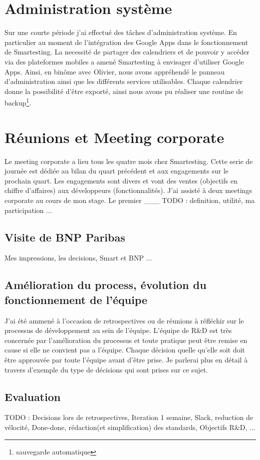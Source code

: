 \section{Administration système}
Sur une courte période j'ai effectué des t\^aches d'administration système. En particulier au moment de l'intégration des Google Apps dans le fonctionnement de Smartesting. La necessité de partager des calendriers et de pouvoir y accéder via des plateformes mobiles a amené Smartesting à envisager d'utiliser Google Apps. Ainsi, en binôme avec Olivier, nous avons appréhendé le panneau d'administration ainsi que les différents services utilisables. Chaque calendrier donne la possibilité d'être exporté, ainsi nous avons pu réaliser une routine de backup\footnote{sauvegarde automatique}.

\section{Réunions et Meeting corporate}
Le meeting corporate a lieu tous les quatre mois chez Smartesting. Cette serie de journée est dédiée au bilan du quart précédent et aux engagements sur le prochain quart. Les engagements sont divers et vont des ventes (objectifs en chiffre d'affaires) aux développeurs (fonctionnalités). J'ai assisté à deux meetings corporate au cours de mon stage. Le premier ___
TODO : definition, utilité, ma participation ...

\subsection{Visite de BNP Paribas}
Mes impressions, les decisions, Smart et BNP ...

\subsection{Amélioration du process, évolution du fonctionnement de l'équipe}
J'ai été ammené à l'occasion de retrospectives ou de réunions à réfléchir sur le processus de développement au sein de l'équipe. L'équipe de R\&D est très concernée par l'amélioration du processus et toute pratique peut être remise en cause si elle ne convient pas a l'équipe. Chaque décision quelle qu'elle soit doit être approuvée par toute l'équipe avant d'être prise. Je parlerai plus en détail à travers d'exemple du type de décisions qui sont prises sur ce sujet.

\subsection{Evaluation}





TODO : Decisions lors de retrospectives, Iteration 1 semaine, Slack, reduction de vélocité, Done-done, rédaction(et simplification) des standards, Objectifs R\&D, ...